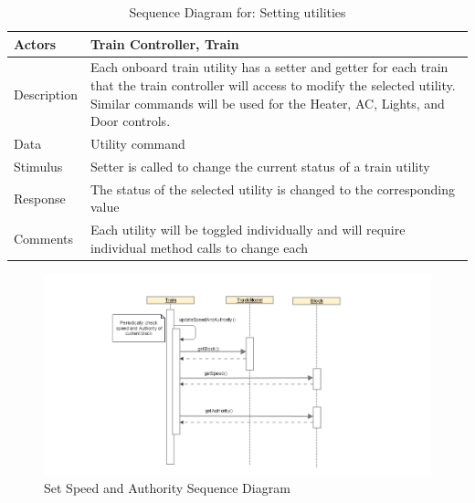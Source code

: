 \documentclass[]{article}
\begin{document}
	\begin{table}[H]
	\centering
	\caption{Sequence Diagram for: Setting utilities}
	\begin{tabular}{|l|l|}
		\hline
		Actors & \parbox[t]{10cm}{Train Controller, Train} \\ \hline
		Description & \parbox[t]{10cm}{Each onboard train utility has a setter and getter for each train that the train controller will access to modify the selected utility. Similar commands will be used for the Heater, AC, Lights, and Door controls. } \\ \hline
		Data &  \parbox[t]{10cm}{Utility command } \\ \hline
		Stimulus &  \parbox[t]{10cm}{Setter is called to change the current status of a train utility} \\ \hline
		Response & \parbox[t]{10cm}{The status of the selected utility is changed to the corresponding value }\\ \hline
		Comments & \parbox[t]{10cm}{Each utility will be toggled individually and will require individual method calls to change each}  \\ \hline
	\end{tabular}
\end{table}

\begin{figure}[H]
	\centering
	\includegraphics[scale=.5]{train_model_sqd_set_speed_authority.png}
	\caption{Set Speed and Authority Sequence Diagram}
\end{figure}
\end{document}
